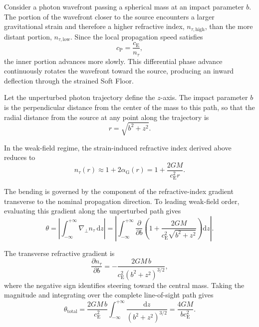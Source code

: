 Consider a photon wavefront passing a spherical mass at an impact parameter $b$. The portion of the wavefront closer to the source encounters a larger gravitational strain and therefore a higher refractive index, $n_{\tau,\mathrm{high}}$, than the more distant portion, $n_{\tau,\mathrm{low}}$. Since the local propagation speed satisfies
\begin{equation}
    c_{\mathrm{P}} = \frac{c_{\mathrm{E}}}{n_\tau},
\end{equation}
the inner portion advances more slowly. This differential phase advance continuously rotates the wavefront toward the source, producing an inward deflection through the strained Soft Floor.

Let the unperturbed photon trajectory define the $z$-axis. The impact parameter $b$ is the perpendicular distance from the center of the mass to this path, so that the radial distance from the source at any point along the trajectory is
\begin{equation}
    r = \sqrt{b^2+z^2}.
\end{equation}

In the weak-field regime, the strain-induced refractive index derived above reduces to
\begin{equation}
    n_\tau(r) \approx 1+2\alpha_{\mathrm{G}}(r) = 1+\frac{2GM}{c_{\mathrm{E}}^2 r}.
\end{equation}

The bending is governed by the component of the refractive-index gradient transverse to the nominal propagation direction. To leading weak-field order, evaluating this gradient along the unperturbed path gives
\begin{equation}
    \theta = \left| \int_{-\infty}^{+\infty} \nabla_{\perp}n_\tau\,\mathrm{d}z \right| = \left| \int_{-\infty}^{+\infty} \frac{\partial}{\partial b} \left( 1+ \frac{2GM}{c_{\mathrm{E}}^2\sqrt{b^2+z^2}} \right) \mathrm{d}z \right|.
\end{equation}

The transverse refractive gradient is
\begin{equation}
    \frac{\partial n_\tau}{\partial b} = -\frac{2GM\,b}{c_{\mathrm{E}}^2\left(b^2+z^2\right)^{3/2}},
\end{equation}
where the negative sign identifies steering toward the central mass. Taking the magnitude and integrating over the complete line-of-sight path gives
\begin{equation}
    \theta_{\mathrm{total}} = \frac{2GM\,b}{c_{\mathrm{E}}^2} \int_{-\infty}^{+\infty} \frac{\mathrm{d}z}{\left(b^2+z^2\right)^{3/2}} = \frac{4GM}{b c_{\mathrm{E}}^2}.
\end{equation}

